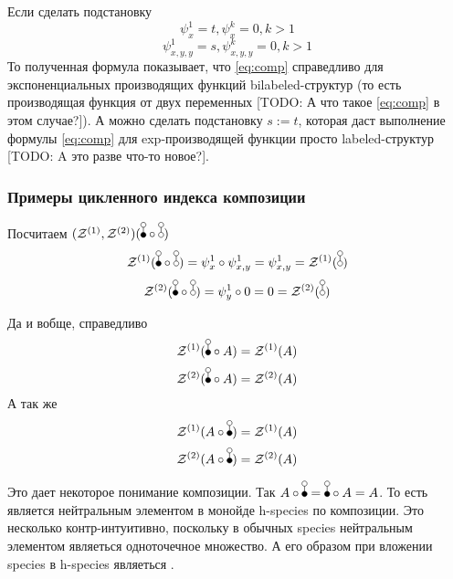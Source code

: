 \begin{remark}
Если сделать подстановку 
$$
\psi_{x}^1 = t, \psi_{x}^k = 0, k>1
$$
$$
\psi_{x,y,y}^1 = s, \psi_{x,y,y}^k = 0, k>1
$$
То полученная формула показывает, что \ref{eq:comp} справедливо для
экспоненциальных производящих функций bilabeled-структур (то есть производящая
функция от двух переменных [TODO: А что такое \ref{eq:comp} в этом случае?]). А
можно сделать подстановку $s := t$, которая даст выполнение формулы
\ref{eq:comp} для exp-производящей функции просто labeled-структур [TODO: A
это разве что-то новое?].
\end{remark}

\subsubsection{Примеры цикленного индекса композиции}
\begin{example}
Посчитаем $(\mathcal Z^{(1)}, \mathcal Z^{(2)})(\dB \circ \dA)$
$$
\mathcal Z^{(1)}(\dB \circ \dA) = \psi_{x}^1 \circ \psi_{x, y}^1 = \psi_{x, y}^1
= \mathcal Z^{(1)}(\dA)
$$ 
$$
\mathcal Z^{(2)}(\dB \circ \dA) = \psi_{y}^1 \circ 0 = 0 = \mathcal Z^{(2)}(\dA)
$$
\end{example}
\begin{example}
Да и вобще, справедливо
$$
\mathcal Z^{(1)}(\dB \circ A) = \mathcal Z^{(1)}(A)
$$ 
$$
\mathcal Z^{(2)}(\dB \circ A) = \mathcal Z^{(2)}(A)
$$
А так же
$$
\mathcal Z^{(1)}(A \circ \dB) = \mathcal Z^{(1)}(A)
$$ 
$$
\mathcal Z^{(2)}(A \circ \dB) = \mathcal Z^{(2)}(A)
$$
\end{example}
Это дает некоторое понимание композиции. Так $A \circ \dB = \dB \circ A = A$.
То есть \dB является нейтральным элементом в монойде h-species по композиции.
Это несколько контр-интуитивно, поскольку в обычных species нейтральным
элементом являеться одноточечное множество. А его образом при вложении species в
h-species являеться \dA.

